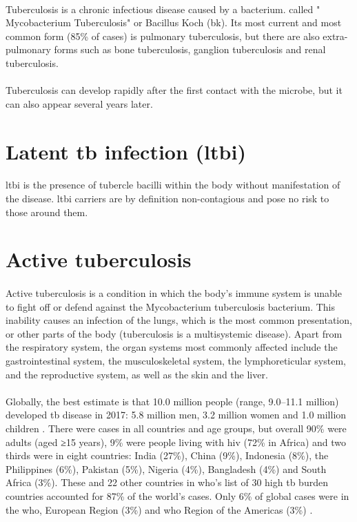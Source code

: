 \paragraph{}
Tuberculosis is a chronic infectious disease caused by a bacterium. called " Mycobacterium Tuberculosis" or Bacillus Koch (\ac{bk}). Its most current and most common form (85\% of cases) is pulmonary tuberculosis, but there are also extra-pulmonary forms such as bone tuberculosis, ganglion tuberculosis and renal tuberculosis.
\paragraph{}
Tuberculosis can develop rapidly after the first contact with the microbe, but it can also appear several years later.
\section{Latent \ac{tb} infection (\ac{ltbi})}
\paragraph{}
\ac{ltbi} is the presence of tubercle bacilli within the body without manifestation of the disease. \ac{ltbi} carriers are by definition non-contagious and pose no risk to those around them.
\section{Active tuberculosis}
\paragraph{}
Active tuberculosis is a condition in which the body’s immune system is unable to fight off or defend against the Mycobacterium tuberculosis bacterium. This inability causes an infection of the lungs, which is the most common presentation, or other parts of the body (tuberculosis is a multisystemic disease). Apart from the respiratory system, the organ systems most commonly affected include the gastrointestinal system, the musculoskeletal system, the lymphoreticular system, and the reproductive system, as well as the skin and the liver.
\paragraph{}
Globally, the best estimate is that 10.0 million people (range, 9.0–11.1 million) developed \ac{tb} disease in 2017: 5.8 million men, 3.2 million women and 1.0 million children \cite{TBT:3}. There were cases in all countries and age groups, but overall 90\% were adults (aged ≥15 years), 9\% were people living with \ac{hiv} (72\% in Africa) and two thirds were in eight countries: India (27\%), China (9\%), Indonesia (8\%), the Philippines (6\%), Pakistan (5\%), Nigeria (4\%), Bangladesh (4\%) and South Africa (3\%). These and 22 other countries in \ac{who}’s list of 30 high \ac{tb} burden countries accounted for 87\% of the world’s cases\cite{TBT:3}. Only 6\% of global cases were in the \ac{who}, European Region (3\%) and \ac{who} Region of the Americas (3\%)
\cite{TBT:3}.
\newpage
